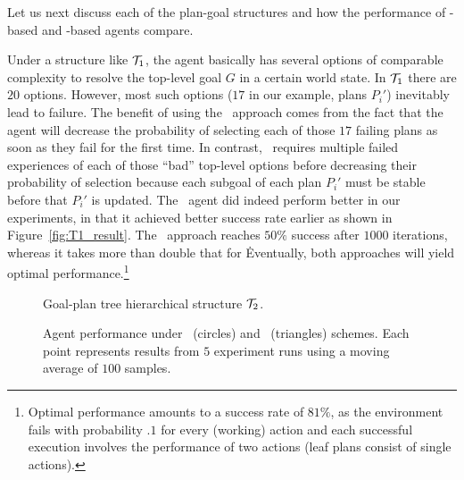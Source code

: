 
Let us next discuss each of the plan-goal structures and how the performance of
\BUL-based and \CL-based agents compare.


Under a structure like $\T_1$, the agent basically has several options of
comparable complexity to resolve the top-level goal $G$ in a certain
world state. In $\T_1$ there are $20$ options.
However, most such options ($17$ in our example, plans $P_i'$)
inevitably lead to failure.  
The benefit of using the \CL\ approach comes from the fact that the agent will
decrease the probability of selecting each of those $17$ failing plans as soon as
they fail for the first time. In contrast, \BUL\ requires multiple failed
experiences of each of those ``bad'' top-level options before decreasing their
probability of selection because each subgoal of each plan $P_i'$ must
be stable before that $P_i'$ is updated. 
The \CL\ agent did indeed perform better in our experiments, in that it
achieved better success rate earlier as shown in Figure~\ref{fig:T1_result}.
The \CL\ approach reaches $50\%$ success after $1000$ iterations,
whereas it takes more than double that for \BUL\.
Eventually, both approaches will yield optimal performance.\footnote{Optimal
performance amounts to a success rate of $81\%$, as the environment fails with
probability $.1$ for every (working) action and each successful execution
involves the performance of two actions (leaf plans consist of single actions).}


\begin{figure}[t]
\begin{center}

\end{center}
\caption{Goal-plan tree hierarchical structure $\T_2$.}
\label{fig:T2}
\end{figure}


\begin{figure*}[t]
\begin{center}
\subfigure[Structure $\T_1$]{\label{fig:T1_result}

}
\qquad
\subfigure[Structure $\T_2$]{\label{fig:T2_result}

}
\qquad
\subfigure[Structure $\T_3$]{\label{fig:T3_result}

}
\caption{Agent performance under \BUL\ (circles) and \CL\ (triangles) schemes.
Each point represents results from $5$ experiment runs using a moving average of $100$ samples.}
\end{center}
\end{figure*}


